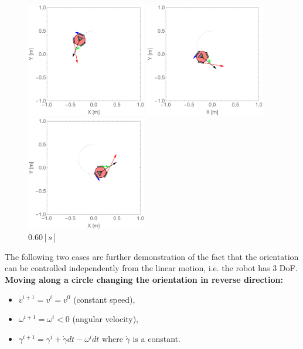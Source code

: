 \documentclass[12pt,english,twoside]{article}
\begin{document}
\begin{figure}[htb!]
	\centering
	\includegraphics[height=5cm]{figures/2d_simulation/animations/2D_move_along_circle_rotating_car_like/20}
	\caption{$0.20[s]$}
	\endminipage\hfill
	\centering
	\includegraphics[height=5cm]{figures/2d_simulation/animations/2D_move_along_circle_rotating_car_like/40}
	\caption{$0.40[s]$}
	\endminipage\hfill
	\centering
	\includegraphics[height=5cm]{figures/2d_simulation/animations/2D_move_along_circle_rotating_car_like/60}
	\caption{$0.60[s]$}
	\endminipage\hfill
\end{figure}
\newpage
The following two cases are further demonstration of the fact that the orientation can be controlled independently from the linear motion, i.e. the robot has 3 DoF. \\[0.3cm]
\noindent \textbf{Moving along a circle changing the orientation in reverse direction:}
\begin{itemize}
	\item $v^{i+1} = v^{i} = v^{0}$ (constant speed),
	\item $\omega^{i+1} = \omega^{i}<0$ (angular velocity),
	\item $\gamma^{i+1} = \gamma^i + \dot \gamma dt -\omega^i dt$ where $\dot \gamma$ is a constant.
\end{itemize}
\end{document}
